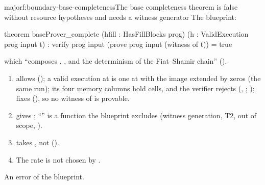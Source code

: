\begin{finding}{major}{f:boundary-base-completeness}{The base completeness theorem is false without resource hypotheses and needs a witness generator}
 The blueprint:
\begin{leancode}
theorem baseProver_complete (hfill : HasFillBlocks prog) (h : ValidExecution prog input t) :
    verify prog input (prove prog input (witness of t)) = true
\end{leancode}
which \enquote{composes , ,
 and the determinism of the Fiat–Shamir chain}
().
\begin{enumerate}[label=(\alph*)]
\item {} allows  (); a valid
  execution at  is one at  with the image extended by zeros (the same
  run); its four memory columns hold  cells, and the verifier rejects
   (, ; );
   fixes  (), so no witness of 
  is provable.
\item {} gives ; \enquote{} is a function
  the blueprint excludes (witness generation, T2, out of scope, ).
\item {} takes , not
   ().
\item The rate is not chosen by .
\end{enumerate}

 An error of the blueprint.


\end{finding}

